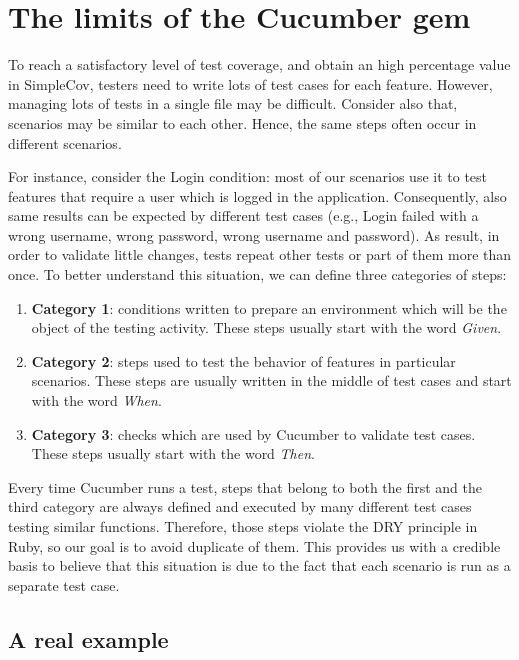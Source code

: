 \chapter{The limits of the Cucumber gem}

To reach a satisfactory level of test coverage, and obtain an high percentage value in SimpleCov, testers need to write lots of test cases for each feature. However, managing lots of tests in a single file may be difficult. Consider also that, scenarios may be similar to each other. Hence, the same steps often occur in different scenarios. 

For instance, consider the Login condition: most of our scenarios use it to test features that require a user which is logged in the application. Consequently, also same results can be expected by different test cases (e.g., Login failed with a wrong username, wrong password, wrong username and password). As result, in order to validate little changes, tests repeat other tests or part of them more than once. To better understand this situation, we can define three categories of steps:

\begin{enumerate}
\item \textbf{Category 1}: conditions written to prepare an environment which will be the object of the testing activity. These steps usually start with the word \textit{Given}.
\item \textbf{Category 2}: steps used to test the behavior of features in particular scenarios. These steps are usually written in the middle of test cases and start with the word \textit{When}.
\item \textbf{Category 3}: checks which are used by Cucumber to validate test cases. These steps usually start with the word \textit{Then}.
\end{enumerate}

Every time Cucumber runs a test, steps that belong to both the first and the third category are always defined and executed by many different test cases testing similar functions. Therefore, those steps violate the DRY principle in Ruby, so our goal is to avoid duplicate of them. This provides us with a credible basis to believe that this situation is due to the fact that each scenario is run as a separate test case. 

\section{A real example}

